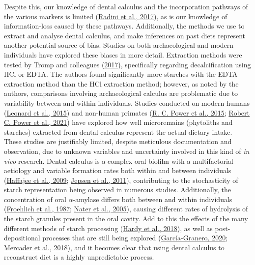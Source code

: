 \documentclass[
  letterpaper,
]{book}
\begin{document}
Despite this, our knowledge of dental calculus and the incorporation
pathways of the various markers is limited
(\protect\hyperlink{ref-radiniFoodPathways2017}{Radini et al., 2017}),
as is our knowledge of information-loss caused by these pathways.
Additionally, the methods we use to extract and analyse dental calculus,
and make inferences on past diets represent another potential source of
bias. Studies on both archaeological and modern individuals have
explored these biases in more detail. Extraction methods were tested by
Tromp and colleagues
(\protect\hyperlink{ref-trompEDTACalculus2017}{2017}), specifically
regarding decalcification using HCl or EDTA. The authors found
significantly more starches with the EDTA extraction method than the HCl
extraction method; however, as noted by the authors, comparisons
involving archaeological calculus are problematic due to variability
between and within individuals. Studies conducted on modern humans
(\protect\hyperlink{ref-leonardPlantMicroremains2015}{Leonard et al.,
2015}) and non-human primates
(\protect\hyperlink{ref-powerChimpCalculus2015}{R. C. Power et al.,
2015}; \protect\hyperlink{ref-powerRepresentativenessDental2021}{Robert
C. Power et al., 2021}) have explored how well microremains (phytoliths
and starches) extracted from dental calculus represent the actual
dietary intake. These studies are justifiably limited, despite
meticulous documentation and observation, due to unknown variables and
uncertainty involved in this kind of \emph{in vivo} research. Dental
calculus is a complex oral biofilm with a multifactorial aetiology and
variable formation rates both within and between individuals
(\protect\hyperlink{ref-haffajeeBiofilmPosition2009}{Haffajee et al.,
2009}; \protect\hyperlink{ref-jepsenCalculusRemoval2011}{Jepsen et al.,
2011}), contributing to the stochasticity of starch representation being
observed in numerous studies. Additionally, the concentration of oral
\(\alpha\)-amylase differs both between and within individuals
(\protect\hyperlink{ref-froehlichEffectOral1987}{Froehlich et al.,
1987}; \protect\hyperlink{ref-naterHumanAmylase2005}{Nater et al.,
2005}), causing different rates of hydrolysis of the starch granules
present in the oral cavity. Add to this the effects of the many
different methods of starch processing
(\protect\hyperlink{ref-hardyRecoveringInformation2018}{Hardy et al.,
2018}), as well as post-depositional processes that are still being
explored
(\protect\hyperlink{ref-graneroStarchTaphonomy2020}{García-Granero,
2020};
\protect\hyperlink{ref-mercaderExaggeratedExpectations2018}{Mercader et
al., 2018}), and it becomes clear that using dental calculus to
reconstruct diet is a highly unpredictable process.
\end{document}
